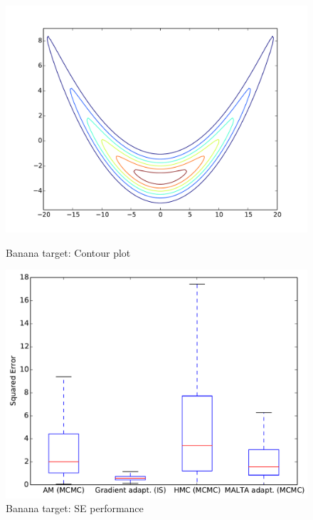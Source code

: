 \begin{figure}[tbp]
\begin{center}
\begin{minipage}[t]{0.5\textwidth}
\centering
\includegraphics[width=\textwidth]{figures/Banana_Contour.pdf} 
\caption{Banana target: Contour plot}
\label{fig:banana_contour}
\end{minipage}\hfill
\begin{minipage}[t]{0.5\textwidth}
\centering
\includegraphics[width=\textwidth]{figures/Banana_boxplot.pdf} 
\caption{Banana target: SE performance} 

\label{fig:banana_box}
\end{minipage}

\end{center}
\end{figure}





